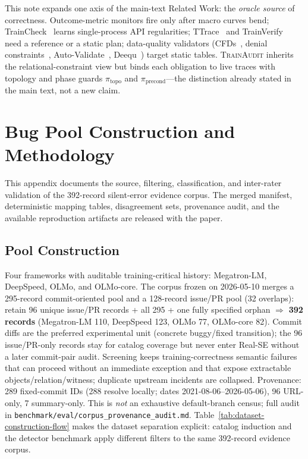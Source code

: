 \documentclass[sigconf,nonacm]{acmart}
\begin{document}
This note expands one axis of the main-text Related Work: the
\emph{oracle source} of correctness.
Outcome-metric monitors fire only after macro curves bend;
TrainCheck~\cite{jiang2025traincheck} learns single-process API regularities;
TTrace~\cite{ttrace2025} and TrainVerify~\cite{trainverify2025} need a reference
or a static plan;
data-quality validators (CFDs~\cite{fan2008cfd}, denial
constraints~\cite{chu2013discovering}, Auto-Validate~\cite{song2021autovalidate},
Deequ~\cite{schelter2018deequ}) target static tables.
\textsc{TrainAudit} inherits the relational-constraint view but binds each
obligation to live traces with topology and phase guards
$\pi_{\text{topo}}$ and $\pi_{\text{precond}}$---the distinction already stated
in the main text, not a new claim.

\section{Bug Pool Construction and Methodology}
\label{app:methodology}

This appendix documents the source, filtering, classification, and
inter-rater validation of the 392-record silent-error evidence corpus. The
merged manifest, deterministic mapping tables, disagreement sets, provenance
audit, and the available reproduction artifacts are released with the paper.

\subsection{Pool Construction}
\label{app:method-pool}

Four frameworks with auditable training-critical history:
Megatron-LM, DeepSpeed, OLMo, and OLMo-core. The corpus frozen on 2026-05-10
merges a 295-record commit-oriented pool and a 128-record issue/PR pool
(32 overlaps): retain 96 unique issue/PR records + all 295 + one fully
specified orphan $\Rightarrow$ \textbf{392 records} (Megatron-LM 110,
DeepSpeed 123, OLMo 77, OLMo-core 82). Commit diffs are the preferred
experimental unit (concrete buggy/fixed transition); the 96 issue/PR-only
records stay for catalog coverage but never enter Real-SE without a later
commit-pair audit. Screening keeps training-correctness semantic failures
that can proceed without an immediate exception and that expose extractable
objects/relation/witness; duplicate upstream incidents are collapsed.
Provenance: 289 fixed-commit IDs (288 resolve locally; dates 2021-08-06--2026-05-06),
96 URL-only, 7 summary-only. This is \emph{not} an exhaustive default-branch
census; full audit in \texttt{benchmark/eval/corpus\_provenance\_audit.md}.
Table~\ref{tab:dataset-construction-flow} makes the dataset separation
explicit: catalog induction and the detector benchmark apply different filters
to the same 392-record evidence corpus.
\end{document}
